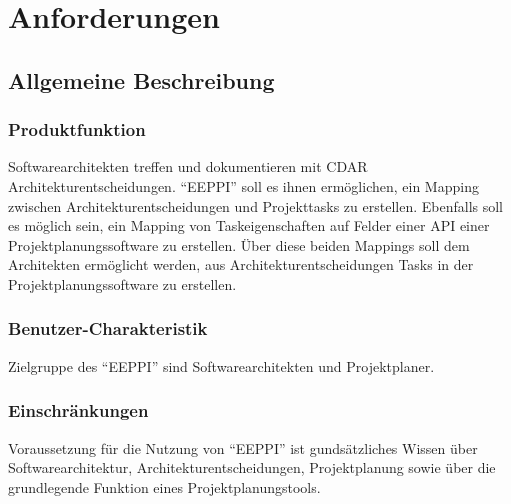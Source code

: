 \chapter{Anforderungen}
\section{Allgemeine Beschreibung}

\subsection{Produktfunktion}
Softwarearchitekten treffen und dokumentieren mit CDAR Architekturentscheidungen.
"`EEPPI"' soll es ihnen ermöglichen, ein Mapping zwischen Architekturentscheidungen und Projekttasks zu erstellen.
Ebenfalls soll es möglich sein, ein Mapping von Taskeigenschaften auf Felder einer API einer Projektplanungssoftware zu erstellen.
Über diese beiden Mappings soll dem Architekten ermöglicht werden, aus Architekturentscheidungen Tasks in der Projektplanungssoftware zu erstellen.

\subsection{Benutzer-Charakteristik}
Zielgruppe des "`EEPPI"' sind Softwarearchitekten und Projektplaner.

\subsection{Einschränkungen}
Voraussetzung für die Nutzung von "`EEPPI"' ist gundsätzliches Wissen über Softwarearchitektur, Architekturentscheidungen, Projektplanung sowie über die grundlegende Funktion eines Projektplanungstools.

